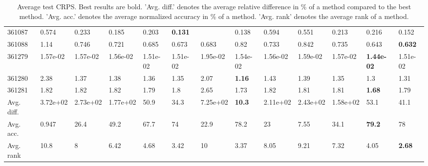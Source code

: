 \begin{table}[ht!]
\begin{tabular}{lllllllllllll}
  361087 & 0.574 & 0.233 & 0.185 & 0.203 & \textbf{0.131} &  & 0.138 & 0.594 & 0.551 & 0.213 & 0.216 & 0.152 \\ 
  361088 & 1.14 & 0.746 & 0.721 & 0.685 & 0.673 & 0.683 & 0.82 & 0.733 & 0.842 & 0.735 & 0.643 & \textbf{0.632} \\ 
  361279 & 1.57e-02 & 1.57e-02 & 1.56e-02 & 1.51e-02 & 1.51e-02 & 1.95e-02 & 1.54e-02 & 1.56e-02 & 1.59e-02 & 1.57e-02 & \textbf{1.44e-02} & 1.51e-02 \\ 
  361280 & 2.38 & 1.37 & 1.38 & 1.36 & 1.35 & 2.07 & \textbf{1.16} & 1.43 & 1.39 & 1.35 & 1.3 & 1.31 \\ 
  361281 & 1.82 & 1.82 & 1.82 & 1.79 & 1.8 & 2.65 & 1.73 & 1.82 & 1.81 & 1.81 & \textbf{1.68} & 1.79 \\ 
   \hline
Avg. diff. & 3.72e+02 & 2.73e+02 & 1.77e+02 & 50.9 & 34.3 & 7.25e+02 & \textbf{10.3} & 2.11e+02 & 2.43e+02 & 1.58e+02 & 53.1 & 41.1 \\ 
  Avg. acc. & 0.947 & 26.4 & 49.2 & 67.7 & 74 & 22.9 & 78.2 & 23 & 7.55 & 34.1 & \textbf{79.2} & 78 \\ 
  Avg. rank & 10.8 & 8 & 6.42 & 4.68 & 3.42 & 10 & 3.37 & 8.05 & 9.21 & 7.32 & 4.05 & \textbf{2.68} \\ 
   \hline
\hline
\end{tabular}
\endgroup
\caption{Average test CRPS. 
                  Best results are bold. 
                  'Avg. diff.' denotes the average relative difference in \% of a method compared to the best method.
                  'Avg. acc.' denotes the average normalized accuracy in \% of a method.
                  'Avg. rank' denotes the average rank of a method.} 
\label{TABLES/table_results_CRPS_clustering}
\end{table}

